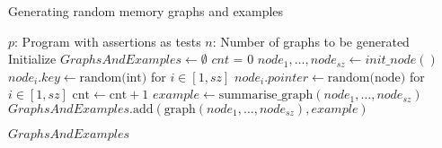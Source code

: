 \begin{algorithm}[t]
  \caption{Generating random memory graphs and examples}
    \label{alg:generateGraphs}
    \begin{algorithmic}[1]
    \Require $p$: Program with assertions as tests
    \Require $n$: Number of graphs to be generated
    \State Initialize $\mathit{GraphsAndExamples} \gets \emptyset$
        \State $\mathit{cnt}$ = 0
        \State $\mathit{node}_1, \dots, \mathit{node}_{\mathit{sz}} \gets \mathit{init\_node}()$
        \State $\mathit{node}_i.key \gets \text{random(int)}$ for $i \in [1, \mathit{sz}]$
        \State $\mathit{node}_i.pointer \gets \text{random(node)}$ for $i \in [1, \mathit{sz}]$
        \State $\text{cnt} \gets \text{cnt} + 1$
        \State $\mathit{example} \gets \text{summarise\_graph}(node_1, \dots, node_{\mathit{sz}})$
        \State $\mathit{GraphsAndExamples}.\text{add}(\text{graph}(\mathit{node}_1, \dots, \mathit{node}_{\mathit{sz}}), \mathit{example})$
        \EndIf
        \EndWhile
    \EndFor
    
    \State \Return $\mathit{GraphsAndExamples}$
    \end{algorithmic}
\end{algorithm}


